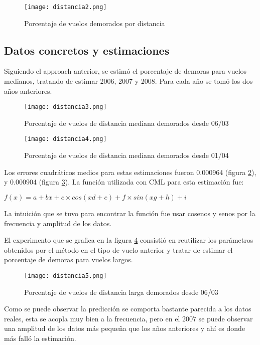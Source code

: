 \begin{figure}[!ht]
\centering
\texttt{[image: distancia2.png]}
\caption{Porcentaje de vuelos demorados por distancia}
\label{distancia-2}
\end{figure}

\subsection{Datos concretos y estimaciones}

Siguiendo el approach anterior, se estimó el porcentaje de demoras para vuelos medianos, tratando de estimar 2006, 2007 y 2008. Para cada año se tomó los dos años anteriores.

\begin{figure}[!ht]
\centering
\texttt{[image: distancia3.png]}
\caption{Porcentaje de vuelos de distancia mediana demorados desde 06/03}
\label{distancia-3}
\end{figure}

\begin{figure}[!ht]
\centering
\texttt{[image: distancia4.png]}
\caption{Porcentaje de vuelos de distancia mediana demorados desde 01/04}
\label{distancia-4}
\end{figure}

Los errores cuadráticos medios para estas estimaciones fueron 0.000964 (figura \ref{distancia-3}), y 0.000904 (figura \ref{distancia-4}). La función utilizada con CML para esta estimación fue:

$f(x) = a + bx + c \times cos(xd + e) + f \times sin(xg + h) + i$

La intuición que se tuvo para encontrar la función fue usar cosenos y senos por la frecuencia y amplitud de los datos.

El experimento que se grafica en la figura \ref{distancia-5} consistió en reutilizar los parámetros obtenidos por el método en el tipo de vuelo anterior y tratar de estimar el porcentaje de demoras para vuelos largos.

\begin{figure}[!ht]
\centering
\texttt{[image: distancia5.png]}
\caption{Porcentaje de vuelos de distancia larga demorados desde 06/03}
\label{distancia-5}
\end{figure}

Como se puede observar la predicción se comporta bastante parecida a los datos reales, esta se acopla muy bien a la frecuencia, pero en el 2007 se puede observar una amplitud de los datos más pequeña que los años anteriores y ahí es donde más falló la estimación.